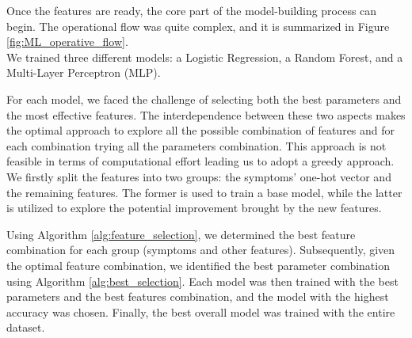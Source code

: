 Once the features are ready, the core part of the model-building process can begin. The operational flow was quite complex,
and it is summarized in Figure \ref{fig:ML_operative_flow}.\\
We trained three different models: a Logistic Regression, a Random Forest, and a Multi-Layer Perceptron (MLP).

For each model, we faced the challenge of selecting both the best parameters and the most effective features. 
The interdependence between these two aspects makes the optimal approach to explore all the possible combination of features
and for each combination trying all the parameters combination. This approach is not feasible in terms of computational effort
leading us to adopt a greedy approach. We firstly split the features into two 
groups: the symptoms' one-hot vector and the remaining features. The former is used to train a base model, 
while the latter is utilized to explore the potential improvement brought by the new features.

Using Algorithm \ref{alg:feature_selection}, we determined the best feature combination for each group (symptoms and other features).
Subsequently, given the optimal feature combination, we identified the best parameter combination using Algorithm 
\ref{alg:best_selection}. Each model was then trained with the best parameters and the best features combination, 
and the model with the highest accuracy was chosen. Finally, the best overall model was trained with the entire dataset.


